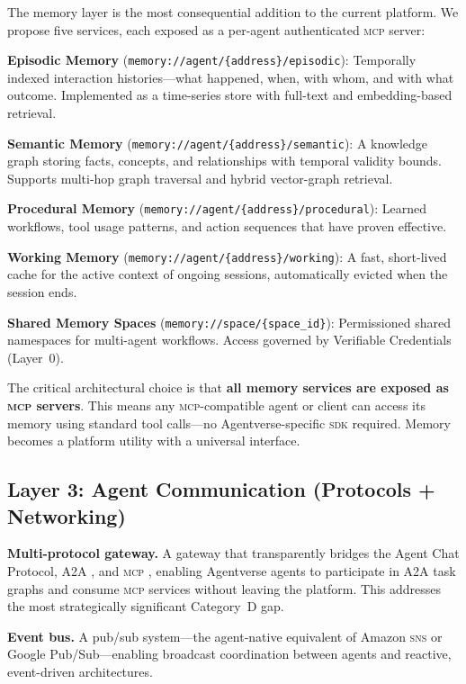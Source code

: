\documentclass[twoside,11pt]{article}
\begin{document}
The memory layer is the most consequential addition to the current platform.
We propose five services, each exposed as a per-agent authenticated
\textsc{mcp} server:

\textbf{Episodic Memory} (\texttt{memory://agent/\{address\}/episodic}):
Temporally indexed interaction histories---what happened, when, with whom, and
with what outcome.  Implemented as a time-series store with full-text and
embedding-based retrieval.

\textbf{Semantic Memory} (\texttt{memory://agent/\{address\}/semantic}): A
knowledge graph \citep{zepgraphiti2025} storing facts, concepts, and relationships
with temporal validity bounds.  Supports multi-hop graph traversal and hybrid
vector-graph retrieval.

\textbf{Procedural Memory} (\texttt{memory://agent/\{address\}/procedural}):
Learned workflows, tool usage patterns, and action sequences that have proven
effective.

\textbf{Working Memory} (\texttt{memory://agent/\{address\}/working}): A fast,
short-lived cache for the active context of ongoing sessions, automatically
evicted when the session ends.

\textbf{Shared Memory Spaces} (\texttt{memory://space/\{space\_id\}}):
Permissioned shared namespaces for multi-agent workflows.  Access governed by
Verifiable Credentials (Layer~0).

The critical architectural choice is that \textbf{all memory services are
exposed as \textsc{mcp} servers}.  This means any \textsc{mcp}-compatible
agent or client can access its memory using standard tool calls---no
Agentverse-specific \textsc{sdk} required.  Memory becomes a platform utility
with a universal interface.

\subsection{Layer 3: Agent Communication (Protocols + Networking)}
\label{subsec:layer3}

\textbf{Multi-protocol gateway.} A gateway that transparently bridges the
Agent Chat Protocol, A2A \citep{a2a2026}, and \textsc{mcp}
\citep{mcp2025spec}, enabling Agentverse agents to participate in A2A task
graphs and consume \textsc{mcp} services without leaving the platform.  This
addresses the most strategically significant Category~D gap.

\textbf{Event bus.} A pub/sub system---the agent-native equivalent of Amazon
\textsc{sns} or Google Pub/Sub---enabling broadcast coordination between agents
and reactive, event-driven architectures.
\end{document}
